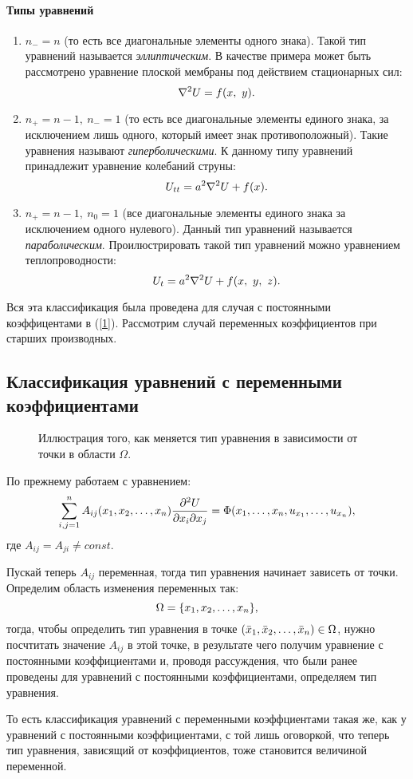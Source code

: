 \documentclass[a4paper,russian]{article}
\begin{document}
\paragraph{Типы уравнений}
\begin{enumerate}
	\item $n_- = n$ (то есть все диагональные элементы одного знака). Такой тип уравнений называется {\it эллиптическим}. В качестве примера может быть рассмотрено уравнение плоской мембраны под действием стационарных сил:  $$\laplacian{U}=f(x,\ y).$$
	\item $n_+ = n-1, \  n_- = 1$ (то есть все диагональные элементы единого знака, за исключением лишь одного, который имеет знак противоположный). Такие уравнения называют {\it гиперболическими}. К данному типу уравнений принадлежит уравнение колебаний струны: $$U_{tt} = a^2\laplacian{U} + f(x).$$ 
	\item $n_+ = n-1,\ n_0=1$ (все диагональные элементы единого знака за исключением одного нулевого). Данный тип уравнений называется {\it параболическим}. Проилюстрировать такой тип уравнений можно уравнением теплопроводности: $$U_t = a^2\laplacian{U}+f\qty(x,\ y,\ z).$$
\end{enumerate}\par
Вся эта классификация была проведена для случая с постоянными коэффицентами в (\ref{1}). Рассмотрим случай переменных коэффициентов при старших производных.

\subsection{Классификация уравнений с переменными коэффициентами}
\begin{figure}[h]
\centering
\def\svgwidth{50mm}
   	
   \caption{Иллюстрация того, как меняется тип уравнения в зависимости от точки в области $\Omega$.}
\end{figure}
По прежнему работаем с уравнением:
\begin{equation}\label{new_1}
\sum\limits_{i,j=1}^{n} A_{ij}\qty(x_1, x_2, \ldots, x_n) \pdv{U}{x_i}{x_j}=\Phi\qty(x_1,\dots,x_n,u_{x_1},\dots,u_{x_n}),
\end{equation}
где $A_{ij} = A_{ji} \ne const$.\par
Пускай теперь $A_{ij}$ переменная, тогда тип уравнения начинает зависеть от точки. Определим область изменения переменных так: $$\Omega = \qty{x_1,x_2,\ldots,x_n},$$ тогда, чтобы определить тип уравнения в точке $\qty(\bar x_1,\bar x_2,\ldots,\bar x_n)\in\Omega$, нужно посчтитать значение $A_{ij}$ в этой точке, в результате чего получим уравнение с постоянными коэффициентами и, проводя рассуждения, что были ранее проведены для уравнений с постоянными коэффициентами, определяем тип уравнения.  \par
То есть классификация уравнений с переменными коэффциентами такая же, как у уравнений с постоянными коэффициентами, с той лишь оговоркой, что теперь тип уравнения, зависящий от коэффициентов, тоже становится величиной переменной.
\medskip
\end{document}
